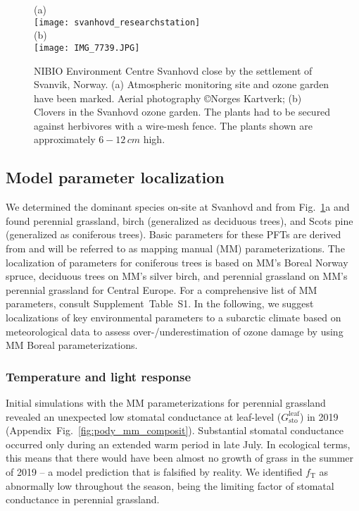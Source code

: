 \documentclass[bg, manuscript]{copernicus}
\begin{document}
\begin{figure}[t]
  \centering
  (a)\\
  \texttt{[image: svanhovd\_researchstation]}\\
  (b)\\
  \texttt{[image: IMG\_7739.JPG]}
  \caption{NIBIO Environment Centre Svanhovd close by the settlement of Svanvik, Norway. (a) Atmospheric monitoring site and ozone garden have been marked. Aerial photography \copyright Norges Kartverk; (b) Clovers in the Svanhovd ozone garden. The plants had to be secured against herbivores with a wire-mesh fence. The plants shown are approximately $6-12\,\unit{cm}$ high.}
  \label{fig:svanhovd_research_station}
\end{figure}

\subsection{Model parameter localization}
\label{sec:localization}

We determined the dominant species on-site at Svanhovd and from Fig.~\ref{fig:svanhovd_research_station}a and found perennial grassland, birch (generalized as deciduous trees), and Scots pine (generalized as coniferous trees). Basic parameters for these PFTs are derived from \citet{EP:Simpson2007,GCB:Mills2011,ICP:MappingManual2017} and will be referred to as mapping manual (MM) parameterizations. The localization of parameters for coniferous trees is based on MM's Boreal Norway spruce, deciduous trees on MM's silver birch, and perennial grassland on MM's perennial grassland for Central Europe. For a comprehensive list of MM parameters, consult Supplement~Table~S1. In the following, we suggest localizations of key environmental parameters to a subarctic climate based on meteorological data to assess over-/underestimation of ozone damage by using MM Boreal parameterizations.

\subsubsection{Temperature and light response}

Initial simulations with the MM parameterizations for perennial grassland revealed an unexpected low stomatal conductance at leaf-level ($G_\mathrm{sto}^\mathrm{leaf}$) in 2019 (Appendix~Fig.~\ref{fig:pody_mm_composit}). Substantial stomatal conductance occurred only during an extended warm period in late July. In ecological terms, this means that there would have been almost no growth of grass in the summer of 2019 -- a model prediction that is falsified by reality. We identified $f_\mathrm{T}$ as abnormally low throughout the season, being the limiting factor of stomatal conductance in perennial grassland.
\end{document}
